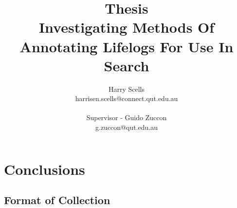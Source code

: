 \documentclass[12pt,a4paper]{article}
\begin{document}
\title{\small Thesis\\\huge Investigating Methods Of Annotating Lifelogs For Use In Search}

\author{Harry Scells\\harrisen.scells@connect.qut.edu.au\\\\\small Supervisor - Guido Zuccon\\\small g.zuccon@qut.edu.au\\}
\maketitle
\pagebreak
\tableofcontents
\pagebreak








\section{Conclusions}

\begin{appendices}
\renewcommand\thetable{\thesection\arabic{table}}
\renewcommand\thefigure{\thesection\arabic{figure}}
\section{Format of Collection} \label{app:format}

\end{appendices}



\end{document}
